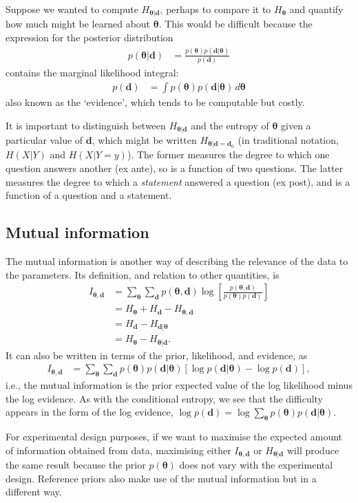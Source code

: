 \documentclass[entropy,article,accept,oneauthor,pdftex,10pt,a4paper]{mdpi}
\renewcommand{\d}{\boldsymbol{d}}
\newcommand{\x}{\boldsymbol{\theta}}
\begin{document}
Suppose we wanted to compute $H_{\x | \d}$, perhaps to compare it to
$H_{\x}$ and quantify how much might be learned about $\x$.
This would be difficult because the expression
for the posterior distribution
\begin{align}
p(\x | \d) &= \frac{p(\x)p(\d | \x)}{p(\d)}
\end{align}
contains the marginal likelihood integral:
\begin{align}
p(\d) &= \int p(\x) p(\d | \x) \, d\x
\end{align}
also known as the `evidence', which tends to be computable but costly.

It is important to distinguish between $H_{\x | \d}$ and the
entropy of $\x$ given a particular value of $\d$, which might be written
$H_{\x | \d=\d_0}$ (in traditional notation, $H(X|Y)$ and $H(X|Y=y)$).
The former measures the degree to which one question answers
another (ex ante), so is a function of two questions. The latter measures the
degree to which a {\em statement} answered a question (ex post),
and is a function of a question and a statement.

\subsection{Mutual information}
The mutual information is another way of describing the relevance of the
data to the parameters. Its definition, and relation to other quantities, is
\begin{align}
I_{\x, \d} &= \sum_{\x} \sum_{\d} p(\x, \d)
                       \log\left[\frac{p(\x, \d)}{p(\x)p(\d)}\right]\\
           &= H_{\x} + H_{\d} - H_{\x, \d}\\
           &= H_{\d} - H_{\d | \x}\\
           &= H_{\x} - H_{\x | \d}.
\end{align}
It can also be written in terms of the prior, likelihood, and evidence,
as
\begin{align}
I_{\x, \d} &= \sum_{\x} \sum_{\d} p(\x)p(\d | \x)
              \left[\log p(\d | \x) - \log p(\d)\right],
\end{align}
i.e., the mutual information is the prior expected value of the
log likelihood minus the log evidence.
As with the conditional entropy, we see that the difficulty appears in the
form of the log evidence,
$\log p(\d) = \log \sum_{\x} p(\x)p(\d | \x)$.

For experimental design purposes, if we want to maximise the expected amount
of information obtained from data, maximising either $I_{\x, \d}$ or
$H_{\x | \d}$ will produce the same result because the prior $p(\x)$ does not
vary with the experimental design. Reference priors
\citep{bernardo2005reference} also make use of the mutual information but in a
different way.
\end{document}
